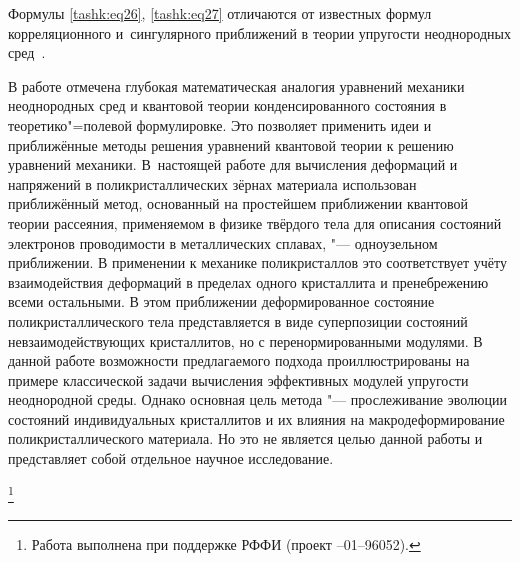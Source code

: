 Формулы \eqref{tashk:eq26}, \eqref{tashk:eq27} отличаются от известных формул корреляционного и~сингулярного приближений в теории упругости неоднородных сред~\cite{tashk:bib4}.
\smallskip

В работе отмечена глубокая математическая аналогия уравнений механики
неоднородных сред и квантовой теории конденсированного состояния в
теоретико"=полевой формулировке. Это позволяет применить идеи и приближённые
методы решения уравнений квантовой теории к решению уравнений механики. 
В~настоящей работе для вычисления деформаций и напряжений в поликристаллических зёрнах материала использован приближённый метод, основанный на
простейшем приближении квантовой теории рассеяния, применяемом в физике
твёрдого тела для описания состояний электронов проводимости в металлических
сплавах, "--- одноузельном приближении. В применении к механике поликристаллов
это соответствует учёту взаимодействия деформаций в пределах одного
кристаллита и пренебрежению всеми остальными. В этом приближении
деформированное состояние поликристаллического тела представляется в виде
суперпозиции состояний невзаимодействующих кристаллитов, но с
перенормированными модулями. В данной работе возможности предлагаемого
подхода проиллюстрированы на примере классической задачи вычисления
эффективных модулей упругости неоднородной среды. Однако основная цель
метода "--- прослеживание эволюции состояний индивидуальных кристаллитов и их
влияния на макродеформирование поликристаллического материала. Но это не является целью данной работы и представляет собой отдельное научное исследование. 

\thanks{Работа выполнена при поддержке РФФИ (проект --01--96052).}

